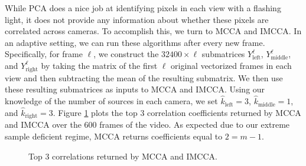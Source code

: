 While PCA does a nice job at identifying pixels in each view with a flashing light, it
does not provide any information about whether these pixels are correlated across
cameras. To accomplish this, we turn to MCCA and IMCCA. In an adaptive setting, we can run
these algorithms after every new frame. Specifically, for frame $\ell$, we construct the
$32400\times \ell$ submatrices $Y_{\text{left}}^{\ell}$, $Y_{\text{middle}}^{\ell}$, and
$Y_{\text{right}}^{\ell}$ by taking the matrix of the first $\ell$ original vectorized
frames in each view and then subtracting the mean of the resulting submatrix. We then use these
resulting submatrices as inputs to MCCA and IMCCA. Using our knowledge of the number of
sources in each camera, we set $\widehat{k}_{\text{left}}=3$,
$\widehat{k}_{\text{middle}}=1$, and $\widehat{k}_{\text{right}}=3$. Figure
\ref{fig:chpt10:mcca_corrs} plots the top 3 correlation coefficients returned by MCCA and IMCCA
over the 600 frames of the video. As expected due to our extreme sample deficient regime,
MCCA returns coefficients equal to $2=m-1$. 

\begin{figure}
  \begin{center}
    \caption{Top 3 correlations returned by MCCA and IMCCA.}
    \label{fig:chpt10:mcca_corrs}
  \end{center}
\end{figure}


